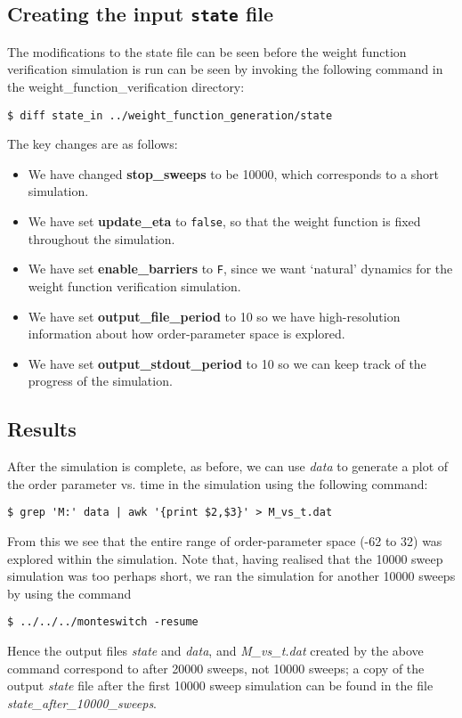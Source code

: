 \documentclass{report}
\begin{document}
\subsection{Creating the input \texttt{state} file}
The modifications to the state file can be seen before the weight function verification simulation is run can be seen by invoking the following command
in the weight\_function\_verification directory:
\begin{verbatim}
$ diff state_in ../weight_function_generation/state
\end{verbatim}
The key changes are as follows:
\begin{itemize}
\item We have changed \textbf{stop\_sweeps} to be 10000, which corresponds to a short simulation.
\item We have set \textbf{update\_eta} to \texttt{false}, so that the weight function is fixed throughout the simulation.
\item We have set \textbf{enable\_barriers} to \texttt{F}, since we want `natural' dynamics for the weight function verification simulation.
\item We have set \textbf{output\_file\_period} to 10 so we have high-resolution information about how order-parameter space is explored.
\item We have set \textbf{output\_stdout\_period} to 10 so we can keep track of the progress of the simulation.
\end{itemize}

\subsection{Results}
After the simulation is complete, as before, we can use \emph{data} to generate a plot of the order parameter vs. time in the simulation using the
following command:
\begin{verbatim}
$ grep 'M:' data | awk '{print $2,$3}' > M_vs_t.dat
\end{verbatim}
From this we see that the entire range of order-parameter space (-62 to 32) was explored within the simulation. Note that, having realised that the
10000 sweep simulation was too perhaps short, we ran the simulation for another 10000 sweeps by using the command
\begin{verbatim}
$ ../../../monteswitch -resume
\end{verbatim}
Hence the output files \emph{state} and \emph{data}, and \emph{M\_vs\_t.dat} created by the above command correspond to after 20000 sweeps, not 10000 
sweeps; a copy of the 
output \emph{state} file after the first 10000 sweep simulation can be found in the file \emph{state\_after\_10000\_sweeps}.
\end{document}
